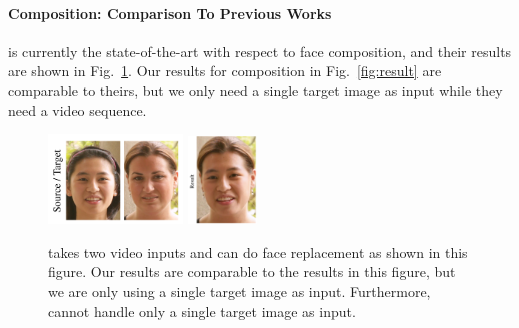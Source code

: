 \paragraph{Composition: Comparison To Previous Works}

\cite{replace} is currently the state-of-the-art with respect to face composition, and their results are shown in Fig.~\ref{replaceres}. Our results for composition in Fig.~\ref{fig:result} are comparable to theirs, but we only need a single target image as input while they need a video sequence.

\begin{figure}[th]
\begin{center}
   \includegraphics[height=90px]{figures/results/daleaa.png}
   \includegraphics[height=88px]{figures/results/dalebb.png}
\end{center}
   \caption{\protect\cite{replace} takes two video inputs and can do face replacement as shown in this figure. Our results are comparable to the results in this figure, but we are only using a single target image as input. Furthermore, \protect\cite{replace} cannot handle only a single target image as input.}
   \vspace{-0.05in}
\label{replaceres}
\end{figure}

